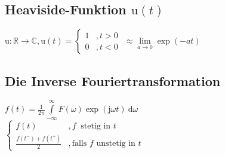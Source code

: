 \documentclass[6pt,a4paper]{scrartcl}
\renewcommand{\i}{\ensuremath{\mathrm{j}}}										%
\newcommand{\ra}[0]{\ensuremath{\rightarrow}} 									%
\newcommand{\diff}{\ensuremath{\ \mathrm d}}									%
\newcommand{\heavi}{\ensuremath{\mathrm{u}}}									%
\newcommand{\R}{\ensuremath{\mathbb R}}
\newcommand{\C}{\ensuremath{\mathbb C}}
\begin{document}
\begin{multicols}{4}
	\subsection{Heaviside-Funktion $\heavi(t)$}
	$\heavi:\R \ra \C, \heavi(t) = \begin{cases} 1 &, t>0 \\ 0 & ,t<0 \end{cases}$ \qquad $\approx \lim\limits_{a \ra 0} \exp(-at)$\\
	
	\subsection{Die Inverse Fouriertransformation}
	$f(t) = \frac{1}{2\pi} \int\limits_{-\infty}^\infty F(\omega) \exp(\i \omega t) \diff \omega$\\
	$\begin{cases} f(t) & ,f\ \text{ stetig in }t \\ \frac{f(t^-) + f(t^+)}{2} & ,\text{falls } f\text{ unstetig in }t \end{cases}$
	
	
	

\end{multicols}
\end{document}
